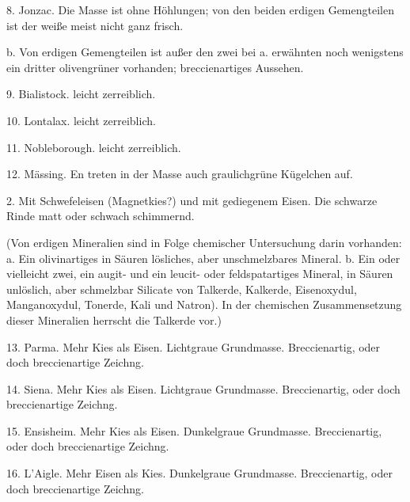 \documentclass[a4paper, 11pt, oneside, polutonikogreek, german]{article}
\begin{document}
\hspace*{15mm}8. Jonzac. Die Masse ist ohne Höhlungen; von den beiden erdigen Gemengteilen ist der weiße meist nicht ganz frisch.

\vspace{2ex}

\hspace*{10mm}b. Von erdigen Gemengteilen ist außer den zwei bei a. erwähnten noch wenigstens ein dritter olivengrüner vorhanden; breccienartiges Aussehen.

\hspace*{15mm}9. Bialistock. leicht zerreiblich.

\hspace*{15mm}10. Lontalax. leicht zerreiblich.

\hspace*{15mm}11. Nobleborough. leicht zerreiblich.

\hspace*{15mm}12. Mässing. En treten in der Masse auch graulichgrüne Kügelchen auf.

\vspace{5ex}

2. Mit Schwefeleisen (Magnetkies?) und mit gediegenem Eisen. Die schwarze Rinde matt oder schwach schimmernd.

\vspace{2ex}

(Von erdigen Mineralien sind in Folge chemischer Untersuchung darin vorhanden: a. Ein olivinartiges in Säuren lösliches, aber unschmelzbares Mineral. b. Ein oder vielleicht zwei, ein augit- und ein leucit- oder feldspatartiges Mineral, in Säuren unlöslich, aber schmelzbar Silicate von Talkerde, Kalkerde, Eisenoxydul, Manganoxydul, Tonerde, Kali und Natron). In der chemischen Zusammensetzung dieser Mineralien herrscht die Talkerde vor.)

\vspace{2ex}

13. Parma. Mehr Kies als Eisen. Lichtgraue Grundmasse. Breccienartig, oder doch breccienartige Zeichng.

14. Siena. Mehr Kies als Eisen. Lichtgraue Grundmasse. Breccienartig, oder doch breccienartige Zeichng.

15. Ensisheim. Mehr Kies als Eisen. Dunkelgraue Grundmasse. Breccienartig, oder doch breccienartige Zeichng.

16. L'Aigle. Mehr Eisen als Kies. Dunkelgraue Grundmasse. Breccienartig, oder doch breccienartige Zeichng.
\end{document}
